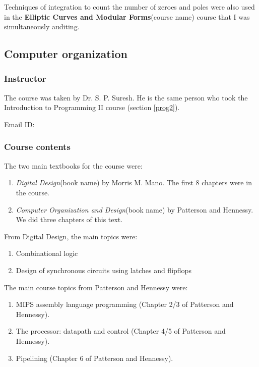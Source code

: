\documentclass[a4paper]{amsart}
\newcommand{\coursename}[1]{{\bf #1}{\small{(course name)}}}
\newcommand{\bookname}[1]{{\em #1}{\small{(book name)}}}
\begin{document}
Techniques of integration to count the number of zeroes and poles
were also used in the \coursename{Elliptic Curves and Modular Forms}
course that I was simultaneously auditing.

\subsection{Computer organization}

\subsubsection{Instructor}

The course was taken by Dr. S. P. Suresh. He is the same person who took the Introduction to Programming II course
(section \ref{prog2}).

Email ID: 

\subsubsection{Course contents}

The two main textbooks for the course were:

\begin{enumerate}

\item \bookname{Digital Design} by Morris M. Mano. The first 8 chapters were in the course.

\item \bookname{Computer Organization and Design} by Patterson and Hennessy. We did three chapters of this text. %

\end{enumerate}

From Digital Design, the main topics were:

\begin{enumerate}

\item Combinational logic

\item Design of synchronous circuits using latches and flipflops

\end{enumerate}


The main course topics from Patterson and Hennessy were:

\begin{enumerate}

\item MIPS assembly language programming (Chapter 2/3 of Patterson and Hennessy).

\item The processor: datapath and control (Chapter 4/5 of Patterson and Hennessy).

\item Pipelining (Chapter 6 of Patterson and Hennessy).

\end{enumerate}
\end{document}
